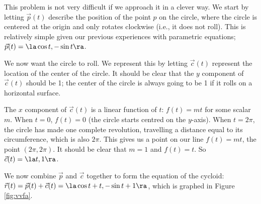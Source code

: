 
{This problem is not very difficult if we approach it in a clever way. We start by letting $\vec p(t)$ describe the position of the point $p$ on the circle, where the circle is centered at the origin and only rotates clockwise (i.e., it  does not roll). This is relatively simple given our previous experiences with parametric equations; $\vec p(t) = \la \cos t, -\sin t\ra$. 

We now want the circle to roll. We represent this by letting $\vec c(t)$ represent the location of the center of the circle. It should be clear that the $y$ component of $\vec c(t)$ should be 1; the center of the circle is always going to be 1 if it rolls on a horizontal surface.

The $x$ component of $\vec c(t)$ is a linear function of $t$: $f(t) = mt$ for some scalar $m$. When $t=0$, $f(t) = 0$ (the circle starts centred on the $y$-axis). When $t=2\pi$, the circle has made one complete revolution, travelling a distance equal to its circumference, which is also $2\pi$. This gives us a point on our line $f(t) = mt$, the point $(2\pi, 2\pi)$. It should be clear that $m=1$ and $f(t) = t$. So $\vec c(t) = \la t, 1\ra$. 

We now combine $\vec p$ and $\vec c$ together to form the equation of the cycloid: $\vec r(t) = \vec p(t) + \vec c(t) = \la \cos t+ t,-\sin t+1\ra$, which is graphed in Figure \ref{fig:vvfa}. 
}\\ 

